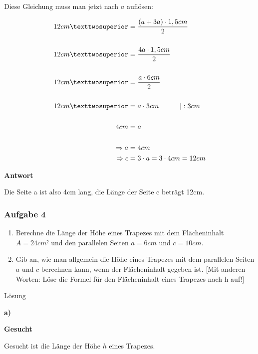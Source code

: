 \documentclass[
  ngerman,
]{book}
\providecommand{\tightlist}{%
  \setlength{\itemsep}{0pt}\setlength{\parskip}{0pt}}
\begin{document}
Diese Gleichung muss man jetzt nach \(a\) auflösen:

\[ \begin{align}
12 cm² &= {(a+3a) \cdot 1,5cm \over 2}\\
{}\\
12 cm² &= {4a \cdot 1,5 cm \over 2}\\
{}\\
12 cm² &= {a \cdot 6cm \over 2} \\
{}\\
12 cm² &= a \cdot 3cm \quad\quad\quad |:3cm \\
{}\\
4cm &= a \\
{}\\
\Rightarrow a &= 4cm\\
\Rightarrow c &= 3 \cdot a = 3 \cdot 4cm = 12 cm
\end{align}\]

\textbf{Antwort}

Die Seite a ist also 4cm lang, die Länge der Seite c beträgt 12cm.

\hypertarget{section-12}{%
\subsubsection*{}\label{section-12}}

\hypertarget{aufgabe-4-2}{%
\subsubsection*{Aufgabe 4}\label{aufgabe-4-2}}

\begin{enumerate}
\def\labelenumi{\alph{enumi})}
\tightlist
\item
  Berechne die Länge der Höhe eines Trapezes mit dem Flächeninhalt \(A=24cm²\) und den parallelen Seiten \(a=6cm\) und \(c=10cm\).
\item
  Gib an, wie man allgemein die Höhe eines Trapezes mit dem parallelen Seiten \(a\) und \(c\) berechnen kann, wenn der Flächeninhalt gegeben ist.
  {[}Mit anderen Worten: Löse die Formel für den Flächeninhalt eines Trapezes nach h auf!{]}
\end{enumerate}

Lösung

\textbf{a)}

\textbf{Gesucht}

Gesucht ist die Länge der Höhe \(h\) eines Trapezes.
\end{document}
